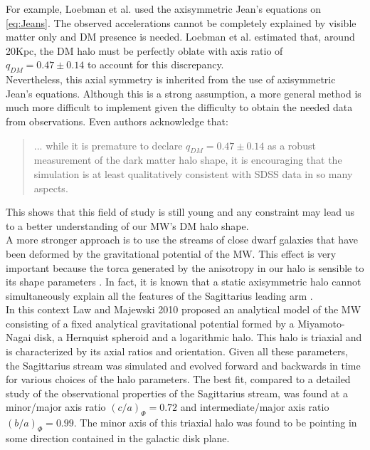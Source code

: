 For example, Loebman et al. \cite{Loebman_et_al._2012} used the axisymmetric Jean's equations on \eqref{eq:Jeans}. 
The observed accelerations cannot be completely explained by visible matter only and DM presence is needed. Loebman et al. estimated that, around 20Kpc, the DM halo must be perfectly oblate with axis ratio of $q_{DM}=0.47 \pm 0.14$ to account for this discrepancy.\\

Nevertheless, this axial symmetry is inherited from the use of axisymmetric Jean's equations. 
Although this is a strong assumption, a more general method is much more difficult to implement given the difficulty to obtain the needed data from observations. 
Even authors acknowledge that:

\blockquote{... while it is premature to declare $q_{DM}=0.47 \pm 0.14$ as a robust measurement of the dark matter halo shape, it is encouraging that the simulation is at least qualitatively consistent with SDSS data in so many aspects.}

This shows that this field of study is still young and any constraint may lead us to a better understanding of our MW's DM halo shape.\\

A more stronger approach is to use the streams of close dwarf galaxies that have been deformed by the gravitational potential of the MW. 
This effect is very important because the torca generated by the anisotropy in our halo is sensible to its shape parameters \cite{Law_and_Majewski_2009,Law_and_Majewski_2010,Deg_and_Lawrence_2013}. 
In fact, it is known that a static axisymmetric halo cannot simultaneously explain all the features of the Sagittarius leading arm \cite{Law_and_Majewski_2009}. \\

In this context Law and Majewski 2010 proposed an analytical model of the MW consisting of a fixed analytical gravitational potential formed by a Miyamoto-Nagai \cite{Miyamoto_and_Nagai_1975} disk, a Hernquist spheroid and a logarithmic halo. 
This halo is triaxial and is characterized by its axial ratios and orientation. 
Given all these parameters, the Sagittarius stream was simulated and evolved forward and backwards in time for various choices of the halo parameters. 
The best fit, compared to a detailed study of the observational properties of the Sagittarius stream, was found at a minor/major axis ratio $(c/a)_{\Phi}=0.72$ and intermediate/major axis ratio $(b/a)_{\Phi}=0.99$. The minor axis of this triaxial halo was found to be pointing in some direction contained in the galactic disk plane. \\


